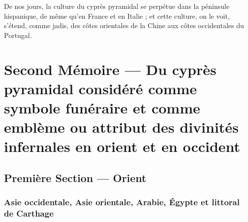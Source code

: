 \documentclass{article}
\begin{document}
De nos jours, la culture du cyprès pyramidal se perpétue dans la péninsule hispanique, de même qu'en France et en Italie ; et cette culture, on le voit, s'étend, comme jadis, des côtes orientales de la Chine aux côtes occidentales du Portugal. 
\clearpage
\setcounter{footnote}{0}
\section{Second Mémoire --- Du cyprès pyramidal considéré comme symbole funéraire et comme emblème ou attribut des divinités infernales en orient et en occident}
\subsection{Première Section --- Orient}
\subsubsection{Asie occidentale, Asie orientale, Arabie, Égypte et littoral de Carthage}
\end{document}
